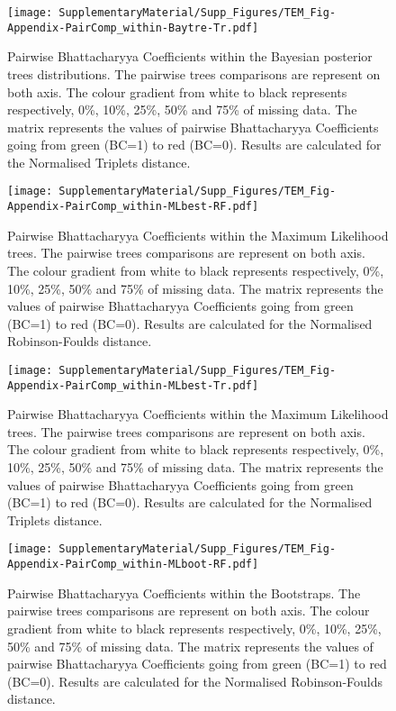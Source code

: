 \begin{figure} 
\centering
    \texttt{[image: SupplementaryMaterial/Supp\_Figures/TEM\_Fig-Appendix-PairComp\_within-Baytre-Tr.pdf]}
\caption{Pairwise Bhattacharyya Coefficients within the Bayesian posterior trees distributions. The pairwise trees comparisons are represent on both axis. The colour gradient from white to black represents respectively, 0\%, 10\%, 25\%, 50\% and 75\% of missing data. The matrix represents the values of pairwise Bhattacharyya Coefficients going from green (BC=1) to red (BC=0). Results are calculated for the Normalised Triplets distance.}
\label{Fig_pairComp-Baytree-Tr}
\end{figure} %

\begin{figure} 
\centering
    \texttt{[image: SupplementaryMaterial/Supp\_Figures/TEM\_Fig-Appendix-PairComp\_within-MLbest-RF.pdf]}
\caption{Pairwise Bhattacharyya Coefficients within the Maximum Likelihood trees. The pairwise trees comparisons are represent on both axis. The colour gradient from white to black represents respectively, 0\%, 10\%, 25\%, 50\% and 75\% of missing data. The matrix represents the values of pairwise Bhattacharyya Coefficients going from green (BC=1) to red (BC=0). Results are calculated for the Normalised Robinson-Foulds distance.}
\label{Fig_pairComp-MLbest-RF}
\end{figure} %

\begin{figure} 
\centering
    \texttt{[image: SupplementaryMaterial/Supp\_Figures/TEM\_Fig-Appendix-PairComp\_within-MLbest-Tr.pdf]}
\caption{Pairwise Bhattacharyya Coefficients within the Maximum Likelihood trees. The pairwise trees comparisons are represent on both axis. The colour gradient from white to black represents respectively, 0\%, 10\%, 25\%, 50\% and 75\% of missing data. The matrix represents the values of pairwise Bhattacharyya Coefficients going from green (BC=1) to red (BC=0). Results are calculated for the Normalised Triplets distance.}
\label{Fig_pairComp-MLbest-Tr}
\end{figure} %

\begin{figure} 
\centering
    \texttt{[image: SupplementaryMaterial/Supp\_Figures/TEM\_Fig-Appendix-PairComp\_within-MLboot-RF.pdf]}
\caption{Pairwise Bhattacharyya Coefficients within the Bootstraps. The pairwise trees comparisons are represent on both axis. The colour gradient from white to black represents respectively, 0\%, 10\%, 25\%, 50\% and 75\% of missing data. The matrix represents the values of pairwise Bhattacharyya Coefficients going from green (BC=1) to red (BC=0). Results are calculated for the Normalised Robinson-Foulds distance.}
\label{Fig_pairComp-MLboot-RF}
\end{figure} %

